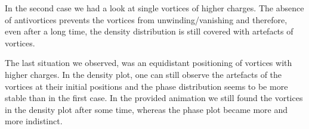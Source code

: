 \begin{description}
In the second case we had a look at single vortices of higher charges. The absence of antivortices prevents the vortices from unwinding/vanishing and therefore, even after a long time, the density distribution is still covered with artefacts of vortices.

The last situation we observed, was an equidistant positioning of vortices with higher charges. In the density plot, one can still observe the artefacts of the vortices at their initial positions and the phase distribution seems to be more stable than in the first case. In the provided animation we still found the vortices in the density plot after some time, whereas the phase plot became more and more indistinct. 
\end{description}